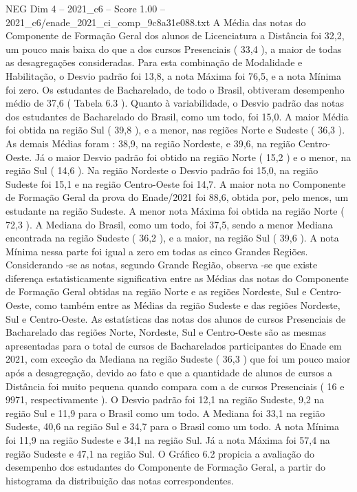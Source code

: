 \begin{textsample}{NEG Dim 4 – 2021\_c6 – Score 1.00 – 2021\_c6/enade\_2021\_ci\_comp\_9c8a31e088.txt}
A Média das notas do Componente de Formação Geral dos alunos de Licenciatura a Distância foi 32,2, um pouco mais baixa do que a dos cursos Presenciais ( 33,4 ), a maior de todas as desagregações consideradas.
Para esta combinação de Modalidade e Habilitação, o Desvio padrão foi 13,8, a nota Máxima foi 76,5, e a nota Mínima foi zero.
Os estudantes de Bacharelado, de todo o Brasil, obtiveram desempenho médio de 37,6 ( Tabela 6.3 ).
Quanto à variabilidade, o Desvio padrão das notas dos estudantes de Bacharelado do Brasil, como um todo, foi 15,0.
A maior Média foi obtida na região Sul ( 39,8 ), e a menor, nas regiões Norte e Sudeste ( 36,3 ).
As demais Médias foram : 38,9, na região Nordeste, e 39,6, na região Centro-Oeste.
Já o maior Desvio padrão foi obtido na região Norte ( 15,2 ) e o menor, na região Sul ( 14,6 ).
Na região Nordeste o Desvio padrão foi 15,0, na região Sudeste foi 15,1 e na região Centro-Oeste foi 14,7.
A maior nota no Componente de Formação Geral da prova do Enade/2021 foi 88,6, obtida por, pelo menos, um estudante na região Sudeste.
A menor nota Máxima foi obtida na região Norte ( 72,3 ).
A Mediana do Brasil, como um todo, foi 37,5, sendo a menor Mediana encontrada na região Sudeste ( 36,2 ), e a maior, na região Sul ( 39,6 ).
A nota Mínima nessa parte foi igual a zero em todas as cinco Grandes Regiões.
Considerando -se as notas, segundo Grande Região, observa -se que existe diferença estatisticamente significativa entre as Médias das notas do Componente de Formação Geral obtidas na região Norte e as regiões Nordeste, Sul e Centro-Oeste, como também entre as Médias da região Sudeste e das regiões Nordeste, Sul e Centro-Oeste.
As estatísticas das notas dos alunos de cursos Presenciais de Bacharelado das regiões Norte, Nordeste, Sul e Centro-Oeste são as mesmas apresentadas para o total de cursos de Bacharelados participantes do Enade em 2021, com exceção da Mediana na região Sudeste ( 36,3 ) que foi um pouco maior após a desagregação, devido ao fato e que a quantidade de alunos de cursos a Distância foi muito pequena quando compara com a de cursos Presenciais ( 16 e 9971, respectivamente ).
O Desvio padrão foi 12,1 na região Sudeste, 9,2 na região Sul e 11,9 para o Brasil como um todo.
A Mediana foi 33,1 na região Sudeste, 40,6 na região Sul e 34,7 para o Brasil como um todo.
A nota Mínima foi 11,9 na região Sudeste e 34,1 na região Sul.
Já a nota Máxima foi 57,4 na região Sudeste e 47,1 na região Sul.
O Gráfico 6.2 propicia a avaliação do desempenho dos estudantes do Componente de Formação Geral, a partir do histograma da distribuição das notas correspondentes.

\end{textsample}
